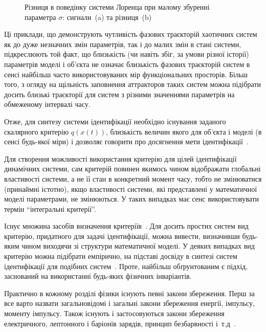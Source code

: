 \begin{figure}[htb!]
  \caption{Різниця в поведінку системи Лоренца при малому збуренні параметра $\sigma$: сигнали~(a) та різниця~(b)}
  \label{atu:f:lor_diff_sigma}
\end{figure}

Ці приклади, що демонструють чутливість фазових траєкторій
хаотичних систем як до дуже незначних змін параметрів,
так і до малих змін в стані системи, підкреслюють той факт, що
близькість (чи навіть збіг, за умови різної історії) параметрів
моделі і об'єкта не означає близькість фазових траєкторій
систем в сенсі найбільш часто використовуваних мір
функціональних просторів. Більш того, з огляду на щільність
заповнення аттракторов таких систем можна підібрати досить
близькі траєкторії для систем з різними значеннями параметрів
на обмеженому інтервалі часу.

Отже, для синтезу системи ідентифікації необхідно існування заданого скалярного
критерію $q(x(t))$, близькість величин якого для об'єкта і моделі (в сенсі
будь-якої міри) і дозволяє говорити про досягнення мети ідентифікації~\cite{crit_method_is}.


Для створення можливості використання критерію для цілей ідентифікації
динамічних системи, сам критерій повинен якимось чином відображати глобальні
властивості системи, а не її стан в конкретний момент часу, тобто не
змінюватися (принаймні істотно), якщо властивості системи, які представлені у
математичної моделі параметрами, не змінюються. У таких випадках має сенс
використовувати термін ``інтегральні критерії''.

Існує множина засобів визначення
критеріїв~\cite{atu_asau11,atu_asau12,atu_asau14,atu_khar_autodor25,atu_asau18,atu_st79,atu_apir2013}.
Для досить простих систем вид критерію, придатного для задачі ідентифікації,
можна вивести, визначивши будь-яким чином виходячи зі структури математичної
моделі. У деяких випадках вид критерію можна підібрати емпірично, на
підставі досвіду в синтезі систем ідентифікації для подібних систем~\cite{atu_asau24}. Проте,
найбільш обґрунтованим є підхід, заснований на використанні будь-яких фізичних
інваріантів.



Практично в кожному розділі фізики існують певні закони
збереження. Перш за все варто назвати загальновідомі і загальні
закони збереження енергії, імпульсу, моменту імпульсу. Також
існують і застосовуються закони збереження електричного,
лептонного і баріонів зарядів, принцип безбарвності
і~т.д~\cite{vigner_invar}.

